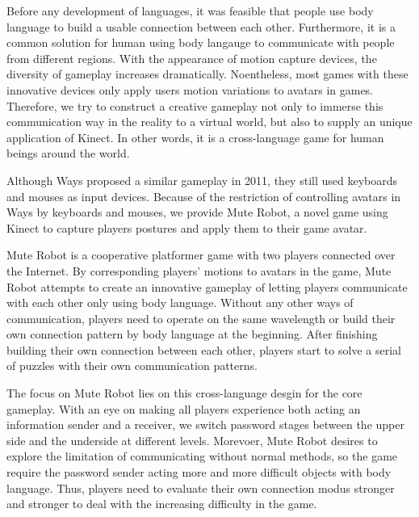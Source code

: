 \documentclass{chi-ext}
\begin{document}
Before any development of languages, it was feasible that people use body language to build a usable connection between each other.
Furthermore, it is a common solution for human using body langauge to communicate with people from different regions.
With the appearance of motion capture devices, the diversity of gameplay increases dramatically.
Noentheless, most games with these innovative devices only apply users motion variations to avatars in games.    
Therefore, we try to construct a creative gameplay not only to immerse this communication way in the reality to a virtual world, but also to supply an unique application of Kinect.
In other words, it is a cross-language game for human beings around the world.
 
Although Ways\cite{Ways} proposed a similar gameplay in 2011, they still used keyboards and mouses as input devices.
Because of the restriction of controlling avatars in Ways by keyboards and mouses, we provide Mute Robot, a novel game using Kinect to capture players postures and apply them to their game avatar.

Mute Robot is a cooperative platformer game with two players connected over the Internet.
By corresponding players' motions to avatars in the game, Mute Robot attempts to create an innovative gameplay of letting players communicate with each other only using body language.
Without any other ways of communication, players need to operate on the same wavelength or build their own connection pattern by body language at the beginning.
After finishing building their own connection between each other, players start to solve a serial of puzzles with their own communication patterns.

The focus on Mute Robot lies on this cross-language desgin for the core gameplay.
With an eye on making all players experience both acting an information sender and a receiver, we switch password stages between the upper side and the underside at different levels.
Morevoer, Mute Robot desires to explore the limitation of communicating without normal methods, so the game require the password sender acting more and more difficult objects with body language.
Thus, players need to evaluate their own connection modus stronger and stronger to deal with the increasing difficulty in the game. 
\end{document}
